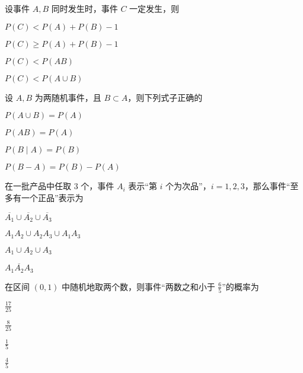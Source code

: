 \documentclass{exam-zh}
\begin{document}
\begin{question}
  设事件 $A, B$ 同时发生时，事件 $C$ 一定发生，则 \paren[B]
  \begin{choices}
    \item $P(C) < P(A) + P(B) - 1$  
    \item $P(C) \geq P(A) + P(B) - 1$  
    \item $P(C) < P(AB)$  
    \item $P(C) < P(A \cup B)$  
  \end{choices}
\end{question}

\begin{question}
  设 $A, B$ 为两随机事件，且 $B \subset A$，则下列式子正确的 \paren[A]
  \begin{choices}
    \item $P(A \cup B) = P(A)$  
    \item $P(AB) = P(A)$  
    \item $P(B \mid A) = P(B)$  
    \item $P(B - A) = P(B) - P(A)$  
  \end{choices}
\end{question}

\begin{question}
  在一批产品中任取 $3$ 个，事件 $A_i$ 表示“第 $i$ 个为次品”，$i=1,2,3$，那么事件“至多有一个正品”表示为 \paren[B]
  \begin{choices}
    \item $\overline{A_1} \cup \overline{A_2} \cup \overline{A_3}$  
    \item $A_1 A_2 \cup A_2 A_3 \cup A_1 A_3$  
    \item $A_1 \cup A_2 \cup A_3$  
    \item $\overline{A_1 A_2 A_3}$  
  \end{choices}
\end{question}

\begin{question}
  在区间 $(0,1)$ 中随机地取两个数，则事件“两数之和小于 $\frac{6}{5}$”的概率为 \paren[A]
  \begin{choices}
    \item $\frac{17}{25}$  
    \item $\frac{8}{25}$  
    \item $\frac{1}{5}$  
    \item $\frac{4}{5}$  
  \end{choices}
\end{question}
\end{document}
